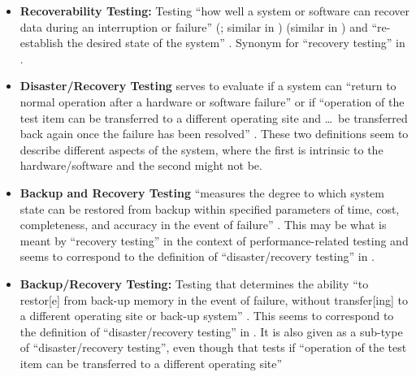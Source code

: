 \begin{itemize}
    \item \textbf{Recoverability Testing:} Testing ``how well a system or
          software can recover data during an interruption or failure''
          \ifnotpaper
              (\citealp[p.~7-10]{SWEBOK2024}; similar in \citealp{ISO_IEC2023a})
          \else
              \cite[p.~7-10]{SWEBOK2024} (similar in \cite{ISO_IEC2023a})
          \fi
          and ``re-establish the desired state of the system'' \citep{ISO_IEC2023a}.
          Synonym for ``recovery testing'' in \citet[p.~47]{Kam2008}.
    \item \textbf{Disaster/Recovery Testing} serves to evaluate if a system
          can ``return to normal operation after a hardware
          or software failure'' \citep[p.~140]{IEEE2017} or if ``operation of
          the test item can be transferred to a different operating site and
          \dots\ be transferred back again once the failure has been
          resolved'' \citeyearpar[p.~37]{IEEE2021}. These two definitions seem to
          describe different aspects of the system, where the first is
          intrinsic to the hardware/software and the second might not be.
    \item \textbf{Backup and Recovery Testing} ``measures the
          degree to which system state can be restored from backup within
          specified parameters of time, cost, completeness, and accuracy in
          the event of failure'' \citep[p.~2]{IEEE2013}. This may be what is
          meant by ``recovery testing'' in the context of performance-related
          testing and seems to correspond to the definition of
          ``disaster/recovery testing'' in \citeyearpar[p.~140]{IEEE2017}.
    \item \textbf{Backup/Recovery Testing:} Testing that determines the
          ability ``to restor[e] from back-up memory in the event of failure,
          without transfer[ing] to a different operating site or back-up
          system'' \citep[p.~37]{IEEE2021}. This seems to correspond to the
          definition of ``disaster/recovery testing'' in
          \citeyearpar[p.~37]{IEEE2021}. It is also given as a sub-type of
          ``disaster/recovery testing'', even though that tests if ``operation
          of the test item can be transferred to a different operating site''

\end{itemize}
